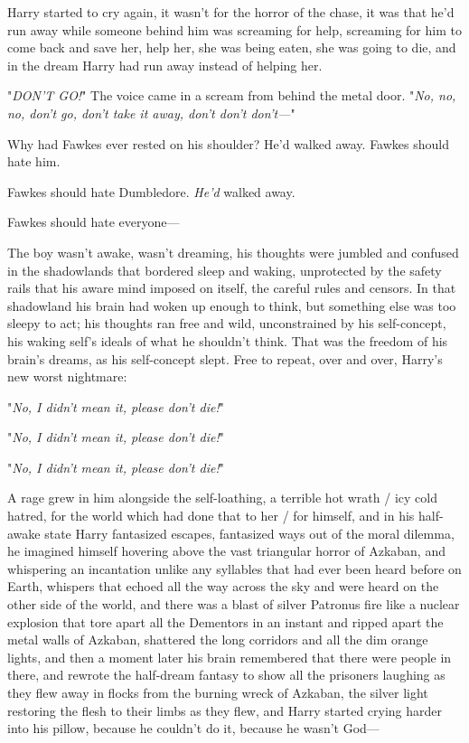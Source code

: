 Harry started to cry again, it wasn't for the horror of the chase, it was that 
he'd run away while someone behind him was screaming for help, screaming for 
him to come back and save her, help her, she was being eaten, she was going to 
die, and in the dream Harry had run away instead of helping her.

"\emph{DON'T GO!}" The voice came in a scream from behind the metal door. "\emph{No, 
no, no, don't go, don't take it away, don't don't don't---}"

Why had Fawkes ever rested on his shoulder? He'd walked away. Fawkes should 
hate him.

Fawkes should hate Dumbledore. \emph{He'd} walked away.

Fawkes should hate everyone---

The boy wasn't awake, wasn't dreaming, his thoughts were jumbled and confused 
in the shadowlands that bordered sleep and waking, unprotected by the safety 
rails that his aware mind imposed on itself, the careful rules and censors. In 
that shadowland his brain had woken up enough to think, but something else was 
too sleepy to act; his thoughts ran free and wild, unconstrained by his 
self-concept, his waking self's ideals of what he shouldn't think. That was the 
freedom of his brain's dreams, as his self-concept slept. Free to repeat, over 
and over, Harry's new worst nightmare:

"\emph{No, I didn't mean it, please don't die!}"

"\emph{No, I didn't mean it, please don't die!}"

"\emph{No, I didn't mean it, please don't die!}"

A rage grew in him alongside the self-loathing, a terrible hot wrath / icy cold 
hatred, for the world which had done that to her / for himself, and in his 
half-awake state Harry fantasized escapes, fantasized ways out of the moral 
dilemma, he imagined himself hovering above the vast triangular horror of 
Azkaban, and whispering an incantation unlike any syllables that had ever been 
heard before on Earth, whispers that echoed all the way across the sky and were 
heard on the other side of the world, and there was a blast of silver Patronus 
fire like a nuclear explosion that tore apart all the Dementors in an instant 
and ripped apart the metal walls of Azkaban, shattered the long corridors and 
all the dim orange lights, and then a moment later his brain remembered that 
there were people in there, and rewrote the half-dream fantasy to show all the 
prisoners laughing as they flew away in flocks from the burning wreck of 
Azkaban, the silver light restoring the flesh to their limbs as they flew, and 
Harry started crying harder into his pillow, because he couldn't do it, because 
he wasn't God---

